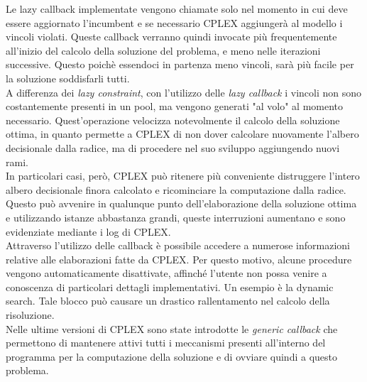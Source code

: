 Le lazy callback implementate vengono chiamate solo nel momento in cui deve essere aggiornato l'incumbent e se necessario CPLEX aggiungerà al modello i vincoli violati. Queste callback verranno quindi invocate più frequentemente all'inizio del calcolo della soluzione del problema, e meno nelle iterazioni successive. Questo poichè essendoci in partenza meno vincoli, sarà più facile per la soluzione soddisfarli tutti.\\
A differenza dei \textit{lazy constraint}, con l'utilizzo delle \textit{lazy callback} i vincoli non sono costantemente presenti in un pool, ma vengono generati "al volo" al momento necessario.  Quest'operazione velocizza notevolmente il calcolo della soluzione ottima, in quanto permette a CPLEX di non dover calcolare nuovamente l'albero decisionale dalla radice, ma di procedere nel suo sviluppo aggiungendo nuovi rami.\\
In particolari casi, però, CPLEX può ritenere più conveniente distruggere l'intero albero decisionale finora calcolato e ricominciare la computazione dalla radice. Questo può avvenire in qualunque punto dell'elaborazione della soluzione ottima e utilizzando istanze abbastanza grandi, queste interruzioni aumentano e sono evidenziate mediante i log di CPLEX.\\
Attraverso l'utilizzo delle callback è possibile accedere a numerose informazioni relative alle elaborazioni fatte da CPLEX. Per questo motivo, alcune procedure vengono automaticamente disattivate, affinché l'utente non possa venire a conoscenza di particolari dettagli implementativi. Un esempio è la dynamic search. Tale blocco può causare un drastico rallentamento nel calcolo della risoluzione.\\
Nelle ultime versioni di CPLEX sono state introdotte le \textit{generic callback} che permettono di mantenere attivi tutti i meccanismi presenti all'interno del programma per la computazione della soluzione e di ovviare quindi a questo problema.  
